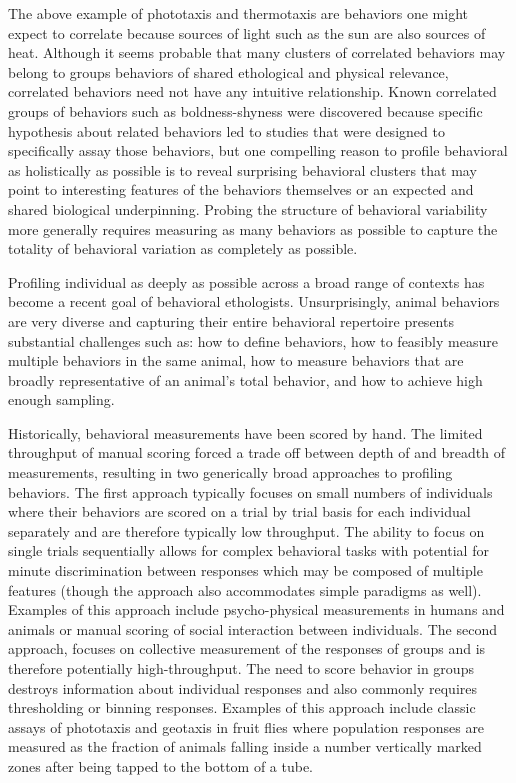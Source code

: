 \documentclass[12pt,letterpaper]{article}
\begin{document}
The above example of phototaxis and thermotaxis are behaviors one might expect to correlate because sources of light such as the sun are also sources of heat. Although it seems probable that many clusters of correlated behaviors may belong to groups behaviors of shared ethological and physical relevance, correlated behaviors need not have any intuitive relationship. Known correlated groups of behaviors such as boldness-shyness were discovered because specific hypothesis about related behaviors led to studies that were designed to specifically assay those behaviors, but one compelling reason to profile behavioral as holistically as possible is to reveal surprising behavioral clusters that may point to interesting features of the behaviors themselves or an expected and shared biological underpinning. Probing the structure of behavioral variability more generally requires measuring as many behaviors as possible to capture the totality of behavioral variation as completely as possible.

Profiling individual as deeply as possible across a broad range of contexts has become a recent goal of behavioral ethologists. Unsurprisingly, animal behaviors are very diverse and capturing their entire behavioral repertoire presents substantial challenges such as: how to define behaviors, how to feasibly measure multiple behaviors in the same animal, how to measure behaviors that are broadly representative of an animal's total behavior, and how to achieve high enough sampling.

Historically, behavioral measurements have been scored by hand. The limited throughput of manual scoring forced a trade off between depth of and breadth of measurements, resulting in two generically broad approaches to profiling behaviors. The first approach typically focuses on small numbers of individuals where their behaviors are scored on a trial by trial basis for each individual separately and are therefore typically low throughput. The ability to focus on single trials sequentially allows for complex behavioral tasks with potential for minute discrimination between responses which may be composed of multiple features (though the approach also accommodates simple paradigms as well). Examples of this approach include psycho-physical measurements in humans and animals or manual scoring of social interaction between individuals. The second approach, focuses on collective measurement of the responses of groups and is therefore potentially high-throughput. The need to score behavior in groups destroys information about individual responses and also commonly requires thresholding or binning responses. Examples of this approach include classic assays of phototaxis and geotaxis in fruit flies where population responses are measured as the fraction of animals falling inside a number vertically marked zones after being tapped to the bottom of a tube.
\end{document}
